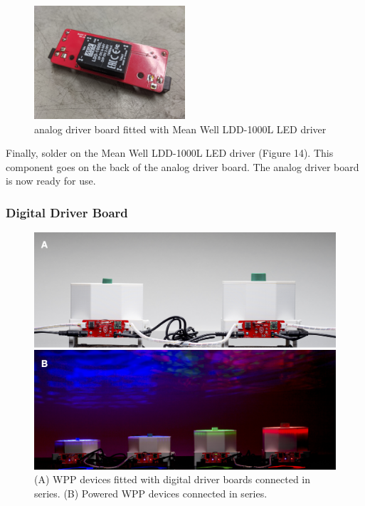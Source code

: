 \documentclass[11pt]{article}
\begin{document}
\begin{figure}[H]
	\centering
	\includegraphics[width=0.5\textwidth]{"./fig14.jpg"}
	\caption{analog driver board fitted with Mean Well LDD-1000L LED driver}
\end{figure}

Finally, solder on the Mean Well LDD-1000L LED driver (Figure 14).
This component goes on the back of the analog driver board.
The analog driver board is now ready for use.



\subsubsection{Digital Driver Board} \label{SEC:digital-driver}

\begin{figure}[H]
  \centering
  \includegraphics[width=\textwidth]{"./fig15.png"}
  \caption{(A) WPP devices fitted with digital driver boards connected in series. (B) Powered WPP devices connected in series.}
  \label{FIG:digital-driver-network}
\end{figure}
\end{document}
